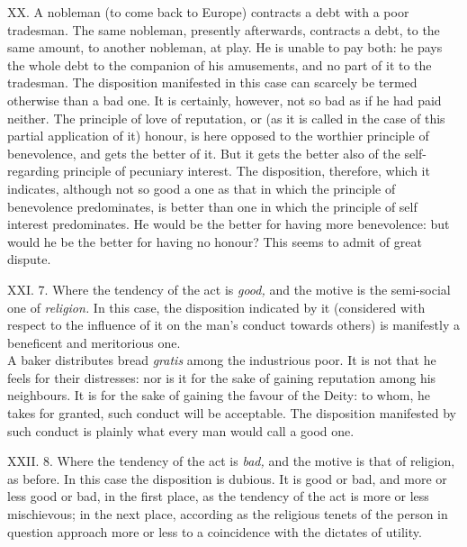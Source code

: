 \documentclass[12pt]{report}
\begin{document}
XX. A nobleman (to come back to Europe) contracts a debt with a poor
tradesman. The same nobleman, presently afterwards, contracts a debt, to
the same amount, to another nobleman, at play. He is unable to pay both:
he pays the whole debt to the companion of his amusements, and no part
of it to the tradesman. The disposition manifested in this case can
scarcely be termed otherwise than a bad one. It is certainly, however,
not so bad as if he had paid neither. The principle of love of
reputation, or (as it is called in the case of this partial application
of it) honour, is here opposed to the worthier principle of benevolence,
and gets the better of it. But it gets the better also of the
self-regarding principle of pecuniary interest. The disposition,
therefore, which it indicates, although not so good a one as that in
which the principle of benevolence predominates, is better than one in
which the principle of self interest predominates. He would be the
better for having more benevolence: but would he be the better for
having no honour? This seems to admit of great dispute.

XXI. 7. Where the tendency of the act is \emph{good,} and the motive is
the semi-social one of \emph{religion.} In this case, the disposition
indicated by it (considered with respect to the influence of it on the
man's conduct towards others) is manifestly a beneficent and meritorious
one.\\
A baker distributes bread \emph{gratis} among the industrious poor. It
is not that he feels for their distresses: nor is it for the sake of
gaining reputation among his neighbours. It is for the sake of gaining
the favour of the Deity: to whom, he takes for granted, such conduct
will be acceptable. The disposition manifested by such conduct is
plainly what every man would call a good one.

XXII. 8. Where the tendency of the act is \emph{bad,} and the motive is
that of religion, as before. In this case the disposition is dubious. It
is good or bad, and more or less good or bad, in the first place, as the
tendency of the act is more or less mischievous; in the next place,
according as the religious tenets of the person in question approach
more or less to a coincidence with the dictates of utility.
\end{document}
